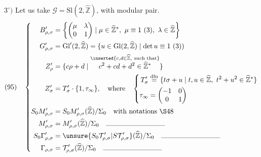 
$3^\circ)$ Let us take $\mathcal G=\mathrm{Sl}(2,\widehat{\mathbb Z})$, with modular pair.
\[
(95)\quad\left\{\begin{aligned}
B'_{\rho,\sigma}&=
\left\{\begin{pmatrix}\mu&\lambda\\0&1\end{pmatrix}\mid
\mu\in\widehat{\mathbb Z}^{*},\ \mu\equiv1\ (3),\ \lambda\in\widehat{\mathbb Z}\right\}\\
G'_{\rho,\sigma}&=\mathrm{Gl}'(2,\widehat{\mathbb Z})
=\{u\in\mathrm{Gl}(2,\widehat{\mathbb Z})\mid\det u\equiv1\ (3))\\
Z'_\rho&=\{c\rho+d\mid
\overset{\inserted{c,d\in\widehat{\mathbb Z},\ \text{such that}}}{c^2+cd+d^2\in\widehat{\mathbb Z}^{*}}\}\\
Z'_\sigma&=T'_\sigma\cdot\{1,\tau_\infty\},\quad\text{where}\quad
\left\{\begin{aligned}
T'_\sigma&\overset{\mathrm{dfn}}=
\{t\sigma+u\mid t,u\in\widehat{\mathbb Z},\ t^2+u^2\in\widehat{\mathbb Z}^{*}\}\\
\tau_\infty&=\begin{pmatrix}-1&0\\0&1\end{pmatrix}
\end{aligned}\right.\\
S_0M'_{\rho,\sigma}&=S_0M'_{\rho,\sigma}(\widehat{\mathbb Z})/\Sigma_0\quad\text{with notations \S48}\\
M'_{\rho,\sigma}&=M'_{\rho,\sigma}(\widehat{\mathbb Z})/\Sigma_0\quad\rule{3cm}{0.3pt}\\
S_0\Gamma'_{\rho,\sigma}&=\unsure{S_0\mathcal T'_{\rho,\sigma}|S\mathcal T'_{\rho,\sigma}}(\widehat{\mathbb Z})/\Sigma_0\quad\rule{3cm}{0.3pt}\\
\Gamma_{\rho,\sigma}&=\mathcal T'_{\rho,\sigma}(\widehat{\mathbb Z})/\Sigma_0\quad\rule{3cm}{0.3pt}
\end{aligned}\right.
\]

